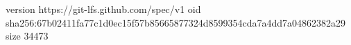version https://git-lfs.github.com/spec/v1
oid sha256:67b02411fa77c1d0ec15f57b85665877324d8599354cda7a4dd7a04862382a29
size 34473
